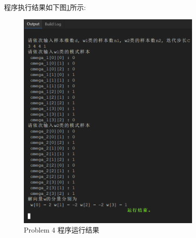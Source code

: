 \documentclass{article}
\begin{document}
\begin{homeworkProblem}
程序执行结果如下图\ref{fig:程序运行结果}所示:
\begin{figure}[H]  %
	\centering
	\includegraphics[width=0.8\textwidth]{images/title/P4运行结果.png}
	\caption{Problem 4 程序运行结果}
	\label{fig:程序运行结果}
\end{figure}
\end{homeworkProblem}

\pagebreak
\end{document}
